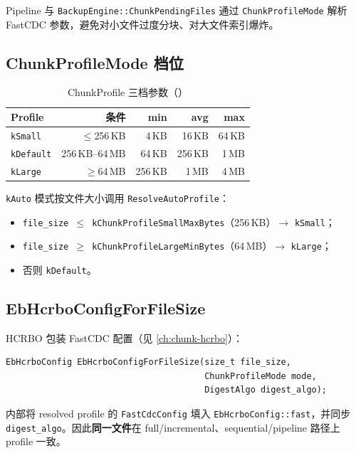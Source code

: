 Pipeline 与 \texttt{BackupEngine::ChunkPendingFiles} 通过 \texttt{ChunkProfileMode} 解析 FastCDC 参数，避免对小文件过度分块、对大文件索引爆炸。

\subsection{ChunkProfileMode 档位}

\begin{table}[htbp]
\centering
\caption{ChunkProfile 三档参数（）}
\label{tab:chunk-profile}
\begin{tabular}{@{}lrrrr@{}}
\toprule
Profile & 条件 & min & avg & max \\
\midrule
\texttt{kSmall} & $\leq$256\,KB & 4\,KB & 16\,KB & 64\,KB \\
\texttt{kDefault} & 256\,KB--64\,MB & 64\,KB & 256\,KB & 1\,MB \\
\texttt{kLarge} & $\geq$64\,MB & 256\,KB & 1\,MB & 4\,MB \\
\bottomrule
\end{tabular}
\end{table}

\texttt{kAuto} 模式按文件大小调用 \texttt{ResolveAutoProfile}：
\begin{itemize}[nosep]
  \item \texttt{file\_size $\leq$ kChunkProfileSmallMaxBytes}（256\,KB）$\rightarrow$ \texttt{kSmall}；
  \item \texttt{file\_size $\geq$ kChunkProfileLargeMinBytes}（64\,MB）$\rightarrow$ \texttt{kLarge}；
  \item 否则 \texttt{kDefault}。
\end{itemize}

\subsection{EbHcrboConfigForFileSize}

HCRBO 包装 FastCDC 配置（见 \cref{ch:chunk-hcrbo}）：

\begin{lstlisting}[caption={chunk\_profile.h 入口},label={lst:chunk-profile-h}]
EbHcrboConfig EbHcrboConfigForFileSize(size_t file_size,
                                       ChunkProfileMode mode,
                                       DigestAlgo digest_algo);
\end{lstlisting}

内部将 resolved profile 的 \texttt{FastCdcConfig} 填入 \texttt{EbHcrboConfig::fast}，并同步 \texttt{digest\_algo}。因此\textbf{同一文件}在 full/incremental、sequential/pipeline 路径上 profile 一致。


